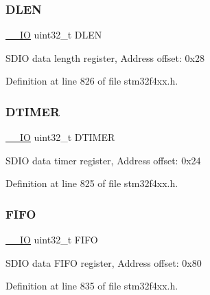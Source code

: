 \subsubsection{\texorpdfstring{D\+L\+EN}{DLEN}}
{\footnotesize\ttfamily \hyperlink{group___c_m_s_i_s__core__definitions_gaec43007d9998a0a0e01faede4133d6be}{\+\_\+\+\_\+\+IO} uint32\+\_\+t D\+L\+EN}

S\+D\+IO data length register, Address offset\+: 0x28 

Definition at line 826 of file stm32f4xx.\+h.

\mbox{\label{struct_s_d_i_o___type_def_a1dd219eaeee8d9def822da843028bd02}} 
\subsubsection{\texorpdfstring{D\+T\+I\+M\+ER}{DTIMER}}
{\footnotesize\ttfamily \hyperlink{group___c_m_s_i_s__core__definitions_gaec43007d9998a0a0e01faede4133d6be}{\+\_\+\+\_\+\+IO} uint32\+\_\+t D\+T\+I\+M\+ER}

S\+D\+IO data timer register, Address offset\+: 0x24 

Definition at line 825 of file stm32f4xx.\+h.

\mbox{\label{struct_s_d_i_o___type_def_a68bef1da5fd164cf0f884b4209670dc8}} 
\subsubsection{\texorpdfstring{F\+I\+FO}{FIFO}}
{\footnotesize\ttfamily \hyperlink{group___c_m_s_i_s__core__definitions_gaec43007d9998a0a0e01faede4133d6be}{\+\_\+\+\_\+\+IO} uint32\+\_\+t F\+I\+FO}

S\+D\+IO data F\+I\+FO register, Address offset\+: 0x80 

Definition at line 835 of file stm32f4xx.\+h.

\mbox{\label{struct_s_d_i_o___type_def_ab27b78e19f487c845437c29812eecca7}} 
